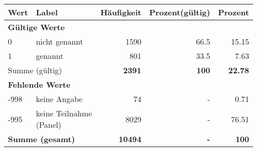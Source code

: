      \begin{longtable}{lXrrr}
     \toprule
     \textbf{Wert} & \textbf{Label} & \textbf{Häufigkeit} & \textbf{Prozent(gültig)} & \textbf{Prozent} \\
     \endhead
     \midrule
     \multicolumn{5}{l}{\textbf{Gültige Werte}}\\

     0 &
     \multicolumn{1}{X}{ nicht genannt   } &


       \num{1590} &
       \num[round-mode=places,round-precision=2]{66,5} &
         \num[round-mode=places,round-precision=2]{15,15} \\

     1 &
     \multicolumn{1}{X}{ genannt   } &


       \num{801} &
       \num[round-mode=places,round-precision=2]{33,5} &
         \num[round-mode=places,round-precision=2]{7,63} \\
     \midrule
     \multicolumn{2}{l}{Summe (gültig)} &
       \textbf{\num{2391}} &
     \textbf{100} &
       \textbf{\num[round-mode=places,round-precision=2]{22,78}} \\
     \multicolumn{5}{l}{\textbf{Fehlende Werte}}\\
       -998 &
       keine Angabe &
         \num{74} &
        - &
         \num[round-mode=places,round-precision=2]{0,71} \\
       -995 &
       keine Teilnahme (Panel) &
         \num{8029} &
        - &
         \num[round-mode=places,round-precision=2]{76,51} \\
     \midrule
     \multicolumn{2}{l}{\textbf{Summe (gesamt)}} &
          \textbf{\num{10494}} &
        \textbf{-} &
        \textbf{100} \\
     \bottomrule
     \end{longtable}
     
